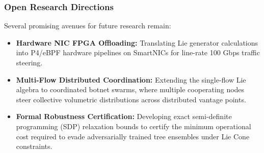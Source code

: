 \documentclass[pdflatex,sn-mathphys-num]{sn-jnl}
\theoremstyle{thmstyleone}
\theoremstyle{thmstyletwo}
\theoremstyle{thmstylethree}
\begin{document}
\subsubsection{Open Research Directions}
Several promising avenues for future research remain:
\begin{itemize}
    \item \textbf{Hardware NIC FPGA Offloading:} Translating Lie generator calculations into P4/eBPF hardware pipelines on SmartNICs for line-rate 100 Gbps traffic steering.
    \item \textbf{Multi-Flow Distributed Coordination:} Extending the single-flow Lie algebra to coordinated botnet swarms, where multiple cooperating nodes steer collective volumetric distributions across distributed vantage points.
    \item \textbf{Formal Robustness Certification:} Developing exact semi-definite programming (SDP) relaxation bounds to certify the minimum operational cost required to evade adversarially trained tree ensembles under Lie Cone constraints.
\end{itemize}


\end{document}
